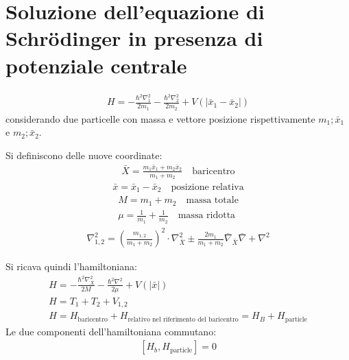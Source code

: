 \chapter[Potenziale centrale]{Soluzione dell'equazione di Schrödinger in presenza di potenziale centrale} %
\begin{equation}\begin{split}
H=-\frac{\hbar ^2\nabla ^2_1}{2m_1}-\frac{\hbar ^2\nabla ^2_2}{2m_2}+V\left(|\bar x_1-\bar x_2|\right)
\end{split}\end{equation}
considerando due particelle con massa e vettore posizione rispettivamente $m_1;\bar x_1$ e $m_2;\bar x_2$.

Si definiscono delle nuove coordinate:
\begin{equation}\begin{split}
\bar X=\frac{m_1\bar x_1+m_2\bar x_2}{m_1+m_2} \quad \textrm{baricentro}
\end{split}\end{equation}
\begin{equation}\begin{split}
\bar x=\bar x_1-\bar x_2 \quad \textrm{posizione relativa}
\end{split}\end{equation}
\begin{equation}\begin{split}
M=m_1+m_2 \quad \textrm{massa totale} \\
\mu=\frac{1}{m_1}+\frac{1}{m_2} \quad \textrm{massa ridotta}
\end{split}\end{equation}
\begin{equation}\begin{split}
\nabla ^2_{1,2}=\left(\frac{m_{1,2}}{m_1+m_2}\right)^2\cdot \nabla ^2_{\bar X}\pm\frac{2m_1}{m_1+m_2}\bar \nabla _{\bar X}\bar \nabla +\nabla ^2
\end{split}\end{equation}

Si ricava quindi l'hamiltoniana:
\begin{equation}\begin{split}
H=-\frac{\hbar ^2\nabla ^2_{\bar X}}{2M}-\frac{\hbar ^2\nabla ^2}{2\mu}+V\left(|\bar x|\right) \\
H=T_1+T_2+V_{1,2}\\
H=H_{\textrm{baricentro}}+H_{\textrm{relativo nel riferimento del baricentro}}=H_B+H_{\textrm{particle}}
\end{split}\end{equation}
Le due componenti dell'hamiltoniana commutano:
\begin{equation}\begin{split}
\left[H_b,H_{\textrm{particle}}\right]=0
\end{split}\end{equation}

